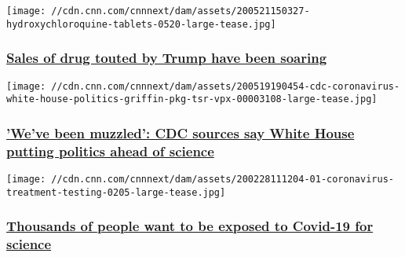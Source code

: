 \href{/2020/05/22/health/hydroxychloroquine-sales-covid-19-trump-invs/index.html}{}

\texttt{[image: //cdn.cnn.com/cnnnext/dam/assets/200521150327-hydroxychloroquine-tablets-0520-large-tease.jpg]}

\hypertarget{sales-of-drug-touted-by-trump-have-been-soaring}{%
\subsubsection{\texorpdfstring{\href{/2020/05/22/health/hydroxychloroquine-sales-covid-19-trump-invs/index.html}{Sales
of drug touted by Trump have been
soaring}}{Sales of drug touted by Trump have been soaring}}\label{sales-of-drug-touted-by-trump-have-been-soaring}}

\href{/2020/05/20/politics/coronavirus-travel-alert-cdc-white-house-tensions-invs/index.html}{}

\texttt{[image: //cdn.cnn.com/cnnnext/dam/assets/200519190454-cdc-coronavirus-white-house-politics-griffin-pkg-tsr-vpx-00003108-large-tease.jpg]}

\hypertarget{weve-been-muzzled-cdc-sources-say-white-house-putting-politics-ahead-of-science}{%
\subsubsection{\texorpdfstring{\href{/2020/05/20/politics/coronavirus-travel-alert-cdc-white-house-tensions-invs/index.html}{'We've
been muzzled': CDC sources say White House putting politics ahead of
science}}{'We've been muzzled': CDC sources say White House putting politics ahead of science}}\label{weve-been-muzzled-cdc-sources-say-white-house-putting-politics-ahead-of-science}}

\href{/2020/05/13/us/coronavirus-human-challenge-study-invs/index.html}{}

\texttt{[image: //cdn.cnn.com/cnnnext/dam/assets/200228111204-01-coronavirus-treatment-testing-0205-large-tease.jpg]}

\hypertarget{thousands-of-people-want-to-be-exposed-to-covid-19-for-science}{%
\subsubsection{\texorpdfstring{\href{/2020/05/13/us/coronavirus-human-challenge-study-invs/index.html}{Thousands
of people want to be exposed to Covid-19 for
science}}{Thousands of people want to be exposed to Covid-19 for science}}\label{thousands-of-people-want-to-be-exposed-to-covid-19-for-science}}

